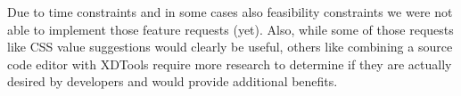 Due to time constraints and in some cases also feasibility constraints we were not able to implement those feature requests (yet). Also, while some of those requests like CSS value suggestions would clearly be useful, others like combining a source code editor with XDTools require more research to determine if they are actually desired by developers and would provide additional benefits.